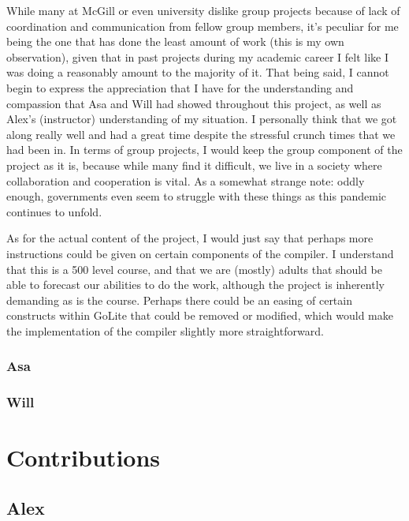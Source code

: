 \documentclass{article}
\begin{document}
While many at McGill or even university dislike group projects because of lack
of coordination and communication from fellow group members, it's peculiar for
me being the one that has done the least amount of work (this is my own
observation), given that in past projects during my academic career I felt like I was doing a reasonably amount to the majority of it.
That being said, I cannot begin to express the appreciation that I have for the
understanding and compassion that Asa and Will had showed throughout this project, as well as Alex's (instructor) understanding of my situation. I personally think that we got along really well and had a great time despite the stressful crunch times that we had been in. In terms of group projects, I would keep the group component of the project as it is, because while many find it difficult, we live in a society where collaboration and cooperation is vital. As a somewhat strange note: oddly enough, governments even seem to struggle with these things as this pandemic continues to unfold.

As for the actual content of the project, I would just say that perhaps more instructions could be given on certain components of the compiler. I understand that this is a 500 level course, and that we are (mostly) adults that should be able to forecast our abilities to do the work, although the project is inherently demanding as is the course. Perhaps there could be an easing of certain constructs within GoLite that could be removed or modified, which would make the implementation of the compiler slightly more straightforward.

\subsubsection{Asa}


\subsubsection{Will}


\section{Contributions}

\subsection{Alex}
\end{document}
